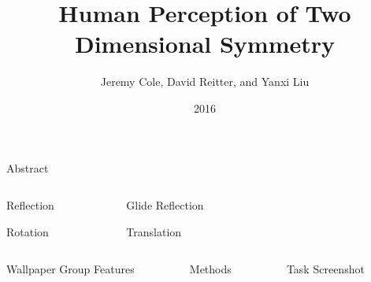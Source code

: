 \documentclass[final,hyperref={pdfpagelabels=false}]{beamer}
\title[Symmetry Perception]{Human Perception of Two Dimensional Symmetry}
\author[Cole \& Reitter \& Liu]{Jeremy Cole, David Reitter, and Yanxi Liu}
\institute[Penn State]{The Pennsylvania State University}
\date{2016}
\begin{document}
  \begin{frame}{} 
    \vfill
    \begin{block}{\LARGE Abstract}
      
    \end{block}    
	\begin{columns}[t]
	\begin{column}{.12\linewidth}
	    	    		\begin{block}{Reflection}
	    	    		 
	    	    		\end{block}
	    	    		\vfill
	    	    		\begin{block}{Rotation}
	    	    		
	    	    		\end{block}
	    	    	\end{column}
	    	    	\begin{column}{.12\linewidth}
	    	    		\begin{block}{Glide Reflection}
	    	    							 
	    		  		\end{block}
	    		  			\vfill
	    	    		\begin{block}{Translation}
	    	    	    		  
	    	    	    \end{block}
	    	    	    	\end{column}
		\begin{column}{0.48\linewidth}
    		
    	\end{column}
    		
    	    	\begin{column}{.24\linewidth}
    	   			   
    	    	\end{column}
    \end{columns}
    \vfill
    
    \begin{columns}[t]
    \begin{column}{.32\linewidth}
        	       		\begin{block}{Wallpaper Group Features}
        	       		 	
        	       		 \end{block}
        	       		 
        	       	\end{column}
    	\begin{column}{.28\linewidth}
    	\begin{block}{Methods}
    	    	
    	    \end{block}
    	\end{column}
    	\begin{column}{.36\linewidth}
    	\begin{block}{Task Screenshot}
    		
    	\end{block}
    	\end{column}
    		

\end{columns}
\end{frame}
\end{document}
